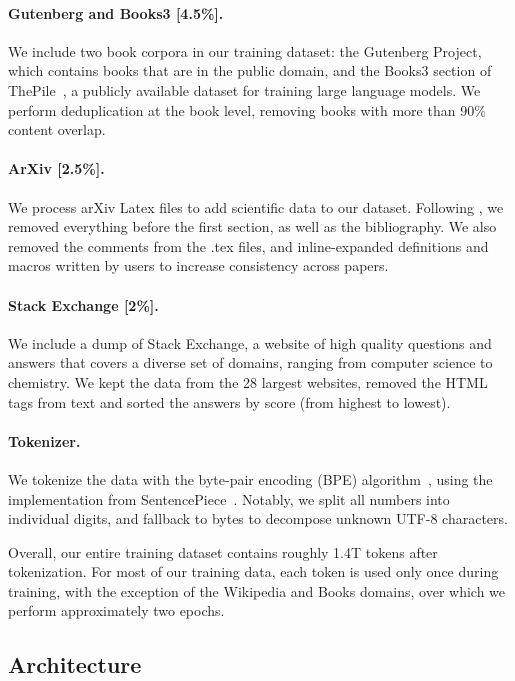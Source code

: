 \paragraph{Gutenberg and Books3 [4.5\%].}
We include two book corpora in our training dataset: the Gutenberg Project, which contains books that are in the public domain, and the Books3 section of ThePile~\citep{pile}, a publicly available dataset for training large language models. We perform deduplication at the book level, removing books with more than 90\% content overlap.

\paragraph{ArXiv [2.5\%].}
We process arXiv Latex files to add scientific data to our dataset. Following \citet{lewkowycz2022solving}, we removed everything before the first section, as well as the bibliography. We also removed the comments from the .tex files, and inline-expanded definitions and macros written by users to increase consistency across papers.

\paragraph{Stack Exchange [2\%].}
We include a dump of Stack Exchange, a website of high quality questions and answers that covers a diverse set of domains, ranging from computer science to chemistry. We kept the data from the 28 largest websites, removed the HTML tags from text and sorted the answers by score (from highest to lowest).

\paragraph{Tokenizer.}
We tokenize the data with the byte-pair encoding (BPE) algorithm~\citep{sennrich2015neural}, using the implementation from SentencePiece~\citep{kudo2018sentencepiece}. Notably, we split all numbers into individual digits, and fallback to bytes to decompose unknown UTF-8 characters.

Overall, our entire training dataset contains roughly 1.4T tokens after tokenization. For most of our training data, each token is used only once during training, with the exception of the Wikipedia and Books domains, over which we perform approximately two epochs.

\subsection{Architecture}

